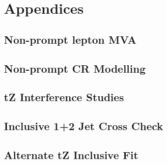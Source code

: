 \documentclass[NOTE, atlasdraft=true, texlive=2016, UKenglish]{\ATLASLATEXPATH atlasdoc}
\begin{document}
\printbibliography
%
%



\clearpage
\appendix
\section{Appendices}

\subsection{Non-prompt lepton MVA}
\label{sec:lepMVA}


\subsection{Non-prompt CR Modelling}
\label{sec:fakeCR_plots}


\subsection{tZ Interference Studies}
\label{sec:tZInt}


\subsection{Inclusive 1+2 Jet Cross Check}
\label{sec:incFit}


\subsection{Alternate tZ Inclusive Fit}
\label{sec:inc_tZ}

\end{document}
